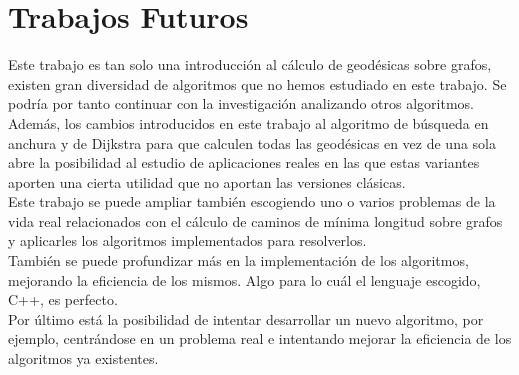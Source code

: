 \section{Trabajos Futuros}

Este trabajo es tan solo una introducción al cálculo de geodésicas sobre grafos, existen gran diversidad de algoritmos que no hemos estudiado en este trabajo. Se podría por tanto continuar con la investigación analizando otros algoritmos. \\

Además, los cambios introducidos en este trabajo al algoritmo de búsqueda en anchura y de Dijkstra para que calculen todas las geodésicas en vez de una sola abre la posibilidad al estudio de aplicaciones reales en las que estas variantes aporten una cierta utilidad que no aportan las versiones clásicas. \\

Este trabajo se puede ampliar también escogiendo uno o varios problemas de la vida real relacionados con el cálculo de caminos de mínima longitud sobre grafos y aplicarles los algoritmos implementados para resolverlos. \\

También se puede profundizar más en la implementación de los algoritmos, mejorando la eficiencia de los mismos. Algo para lo cuál el lenguaje escogido, C++, es perfecto. \\

Por último está la posibilidad de intentar desarrollar un nuevo algoritmo, por ejemplo, centrándose en un problema real e intentando mejorar la eficiencia de los algoritmos ya existentes.

\endinput



